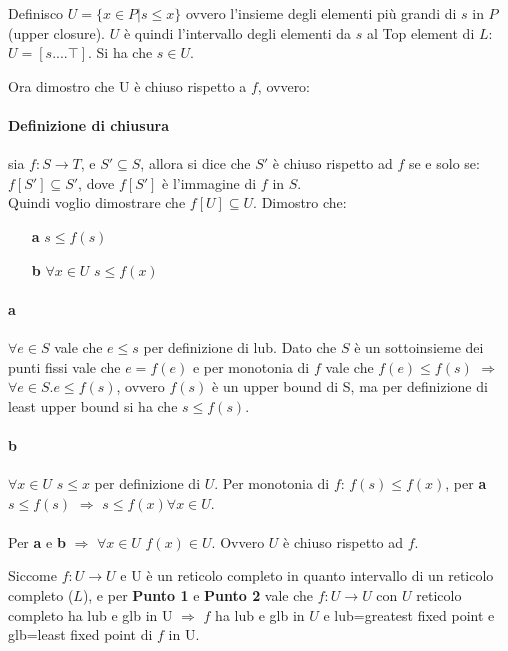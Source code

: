 \documentclass{article}
\begin{document}
Definisco $U = \{ x\in P| s \leq x\}$ ovvero l'insieme degli elementi più grandi di $s$ in $P$ (upper closure). $U$ è quindi l'intervallo degli elementi da $s$ al Top element di $L$: $U=[s....\top]$. Si ha che $s \in U$.

Ora dimostro che U è chiuso rispetto a $f$, ovvero:
\paragraph{Definizione di chiusura} sia $f: S \to T$, e $S'\subseteq S$, allora si dice che $S'$ è chiuso rispetto ad $f$ se e solo se:
$f[S'] \subseteq S'$, dove $f[S']$ è l'immagine di $f$ in $S$.\\

Quindi voglio dimostrare che $f[U] \subseteq U$. Dimostro che: 
\begin{itemize}
    \item[\textbf{a}] $s \leq f(s)$
    \item[\textbf{b}] $\forall x \in U$ $s \leq f(x)$
\end{itemize}

\paragraph{a} $\forall e \in S$ vale che $ e \leq s$ per definizione di lub. Dato che $S$ è un sottoinsieme dei punti fissi vale che $ e = f(e)$ e per monotonia di $f $ vale che $f(e) \leq f(s)$ $\Rightarrow$ $\forall e \in S. e \leq f(s)$, ovvero $f(s)$ è un upper bound di S, ma per definizione di least upper bound si ha che $s \leq f(s)$.

\paragraph{b} $\forall x \in  U$ $s \leq x$ per definizione di $U$. Per monotonia di $f$: $f(s) \leq f(x)$, per \textbf{a} $s \leq f(s)$ $\Rightarrow$ $s \leq f(x) \forall x \in U$. \\\\

 Per \textbf{a} e \textbf{b} $\Rightarrow$ $\forall x \in U $ $f(x) \in U$. Ovvero $U$ è chiuso rispetto ad $f$.


Siccome $f: U \to U $ e U è un reticolo completo in quanto intervallo di un reticolo completo ($L$), e per \textbf{Punto 1} e \textbf{Punto 2} vale che $f:U \to U$ con $U$ reticolo completo ha lub e glb  in U $\Rightarrow$ $f$ ha lub e glb in $U$ e lub=greatest fixed point e glb=least fixed point di $f$ in U.
\end{document}
